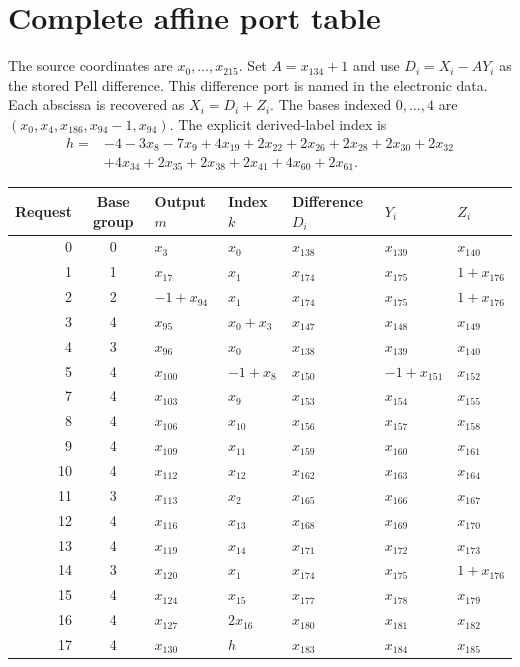\documentclass[11pt]{article}
\theoremstyle{definition}\newtheorem{definition}[theorem]{Definition}
\newcommand{\code}[1]{\texttt{\detokenize{#1}}}
\begin{document}
\appendix
\section{Complete affine port table}\label{app:ports}

The source coordinates are $x_0,\ldots,x_{215}$. Set $A=x_{134}+1$ and
use $D_i=X_i-AY_i$ as the stored Pell difference. This difference port
is named \code{D} in the electronic data. Each abscissa is recovered as
$X_i=D_i+Z_i$.
The bases indexed $0,\ldots,4$ are
$(x_0,x_4,x_{186},x_{94}-1,x_{94})$.
The explicit derived-label index is
\begin{align*}
 h={}&-4-3x_8-7x_9+4x_{19}+2x_{22}+2x_{26}+2x_{28}+2x_{30}+2x_{32}\\
 &+4x_{34}+2x_{35}+2x_{38}+2x_{41}+4x_{60}+2x_{61}.
\end{align*}
\begin{center}\small
\begin{longtable}{rclllll}
\toprule Request & Base group & Output $m$ & Index $k$ & Difference $D_i$ & $Y_i$ & $Z_i$\\\midrule\endhead
0 & 0 & $x_{3}$ & $x_{0}$ & $x_{138}$ & $x_{139}$ & $x_{140}$\\
1 & 1 & $x_{17}$ & $x_{1}$ & $x_{174}$ & $x_{175}$ & $1 +x_{176}$\\
2 & 2 & $-1 +x_{94}$ & $x_{1}$ & $x_{174}$ & $x_{175}$ & $1 +x_{176}$\\
3 & 4 & $x_{95}$ & $x_{0} +x_{3}$ & $x_{147}$ & $x_{148}$ & $x_{149}$\\
4 & 3 & $x_{96}$ & $x_{0}$ & $x_{138}$ & $x_{139}$ & $x_{140}$\\
5 & 4 & $x_{100}$ & $-1 +x_{8}$ & $x_{150}$ & $-1 +x_{151}$ & $x_{152}$\\
7 & 4 & $x_{103}$ & $x_{9}$ & $x_{153}$ & $x_{154}$ & $x_{155}$\\
8 & 4 & $x_{106}$ & $x_{10}$ & $x_{156}$ & $x_{157}$ & $x_{158}$\\
9 & 4 & $x_{109}$ & $x_{11}$ & $x_{159}$ & $x_{160}$ & $x_{161}$\\
10 & 4 & $x_{112}$ & $x_{12}$ & $x_{162}$ & $x_{163}$ & $x_{164}$\\
11 & 3 & $x_{113}$ & $x_{2}$ & $x_{165}$ & $x_{166}$ & $x_{167}$\\
12 & 4 & $x_{116}$ & $x_{13}$ & $x_{168}$ & $x_{169}$ & $x_{170}$\\
13 & 4 & $x_{119}$ & $x_{14}$ & $x_{171}$ & $x_{172}$ & $x_{173}$\\
14 & 3 & $x_{120}$ & $x_{1}$ & $x_{174}$ & $x_{175}$ & $1 +x_{176}$\\
15 & 4 & $x_{124}$ & $x_{15}$ & $x_{177}$ & $x_{178}$ & $x_{179}$\\
16 & 4 & $x_{127}$ & $2x_{16}$ & $x_{180}$ & $x_{181}$ & $x_{182}$\\
17 & 4 & $x_{130}$ & $h$ & $x_{183}$ & $x_{184}$ & $x_{185}$\\
\bottomrule\end{longtable}\end{center}
\end{document}
